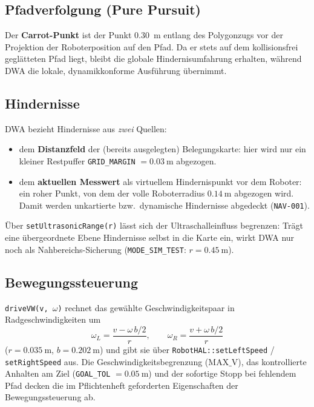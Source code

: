 \documentclass[
  a4paper,
  12pt,
  DIV=12,        %
  parskip=half,  %
  headings=small %
]{scrartcl}
\theoremstyle{definition}
\providecommand{\tightlist}{%
  \setlength{\itemsep}{0pt}\setlength{\parskip}{0pt}}
\theoremstyle{definition}
\begin{document}
\subsection{Pfadverfolgung (Pure Pursuit)}\label{dwa-carrot}

Der \textbf{Carrot-Punkt} ist der Punkt \SI{0.30}{\meter} entlang des
Polygonzugs vor der Projektion der Roboterposition auf den Pfad. Da er
stets auf dem kollisionsfrei geglätteten Pfad liegt, bleibt die globale
Hindernisumfahrung erhalten, während DWA die lokale, dynamikkonforme
Ausführung übernimmt.

\subsection{Hindernisse}\label{dwa-hindernisse}

DWA bezieht Hindernisse aus \emph{zwei} Quellen:

\begin{itemize}
\tightlist
\item
  dem \textbf{Distanzfeld} der (bereits ausgelegten) Belegungskarte:
  hier wird nur ein kleiner Restpuffer \texttt{GRID\_MARGIN}
  $= \SI{0.03}{\meter}$ abgezogen.
\item
  dem \textbf{aktuellen Messwert} als virtuellem Hindernispunkt
  vor dem Roboter: ein roher Punkt, von dem der volle Roboterradius
  $\SI{0.14}{\meter}$ abgezogen wird. Damit werden unkartierte bzw.\
  dynamische Hindernisse abgedeckt (\texttt{NAV-001}).
\end{itemize}

Über \texttt{setUltrasonicRange(r)} lässt sich der Ultraschalleinfluss
begrenzen: Trägt eine übergeordnete Ebene Hindernisse selbst in die
Karte ein, wirkt DWA nur noch als Nahbereichs-Sicherung
(\texttt{MODE\_SIM\_TEST}: $r = \SI{0.45}{\meter}$).

\subsection{Bewegungssteuerung}\label{dwa-bewegungssteuerung}

\texttt{driveVW(v, \ensuremath{\omega})} rechnet das gewählte
Geschwindigkeitspaar in Radgeschwindigkeiten um
\[
\omega_L = \frac{v - \omega\,b/2}{r},
\qquad
\omega_R = \frac{v + \omega\,b/2}{r}
\]
($r = \SI{0.035}{\meter}$, $b = \SI{0.202}{\meter}$) und gibt sie über
\texttt{RobotHAL::setLeftSpeed} / \texttt{setRightSpeed} aus. Die
Geschwindigkeitsbegrenzung ($\text{MAX\_V}$), das kontrollierte Anhalten
am Ziel (\texttt{GOAL\_TOL} $= \SI{0.05}{\meter}$) und der sofortige
Stopp bei fehlendem Pfad decken die im Pflichtenheft geforderten
Eigenschaften der Bewegungssteuerung ab.
\end{document}
